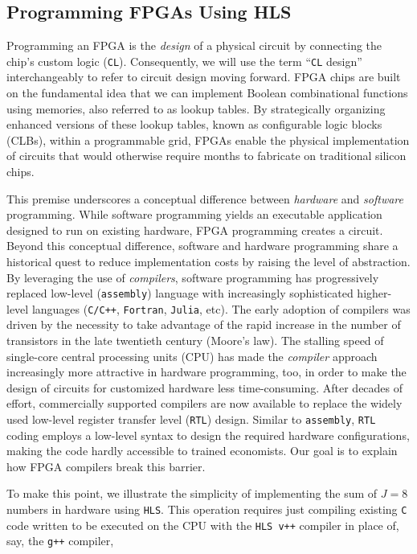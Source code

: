 \documentclass[12pt,american]{article}
\newcommand{\Naccsize}{J}
\begin{document}
\subsection{Programming FPGAs Using HLS}\label{sec:prohls}

Programming an FPGA is the \textit{design} of a physical circuit by connecting the chip's custom logic (\texttt{CL}). Consequently, we will use the term ``\texttt{CL} design'' interchangeably to refer to circuit design moving forward. FPGA chips are built on the fundamental idea that we can implement Boolean combinational functions using memories, also referred to as lookup tables.  By strategically organizing enhanced versions of these lookup tables, known as configurable logic blocks (CLBs), within a programmable grid, FPGAs enable the physical implementation of circuits that would otherwise require months to fabricate on traditional silicon chips.  

This premise underscores a conceptual difference between \textit{hardware} and \textit{software} programming. While software programming yields an executable application designed to run on existing hardware, FPGA programming creates a circuit. Beyond this conceptual difference, software and hardware programming share a historical quest to reduce implementation costs by raising the level of abstraction. By leveraging the use of \textit{compilers}, software programming has progressively replaced low-level (\texttt{assembly}) language with increasingly sophisticated higher-level languages (\texttt{C/C++}, \texttt{Fortran}, \texttt{Julia}, etc). The early adoption of compilers was driven by the necessity to take advantage of the rapid increase in the number of transistors in the late twentieth century (Moore's law). The stalling speed of single-core central processing units (CPU) has made the \textit{compiler} approach increasingly more attractive in hardware programming, too, in order to make the design of circuits for customized hardware less time-consuming. After decades of effort, commercially supported compilers \citep{xilinx_ug1145,intel_hls2021} are now available to replace the widely used low-level register transfer level (\texttt{RTL}) design. Similar to \texttt{assembly}, \texttt{RTL} coding employs a low-level syntax to design the required hardware configurations, making the code hardly accessible to trained economists. Our goal is to explain how FPGA compilers break this barrier.

To make this point, we illustrate the simplicity of implementing the sum of $\Naccsize=8$ numbers in hardware using \texttt{HLS}. This operation requires just compiling existing \texttt{C} code written to be executed on the CPU with the \texttt{HLS v++} compiler in place of, say, the \texttt{g++} compiler,
\end{document}
